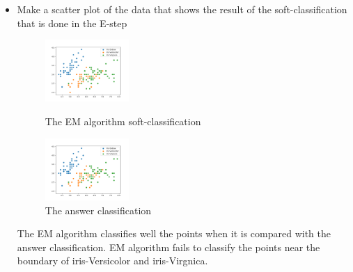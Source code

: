 \documentclass[a4paper]{article}
\begin{document}
\begin{itemize}
		\clearpage
		\item Make a scatter plot of the data that shows the result of the soft-classiﬁcation that is done in the E-step

		\begin{figure}[h]
			\begin{center}
				\includegraphics[width=0.3\textwidth]{4class.png}
				\caption{The EM algorithm soft-classification}
				\includegraphics[width=0.3\textwidth]{4_answer.png}
				\caption{The answer classification}
			\end{center}
		\end{figure}

		The EM algorithm classifies well the points when it is compared with the answer classification. EM algorithm fails to classify the points near the boundary of iris-Versicolor and iris-Virgnica.

	\end{itemize}
\end{document}
